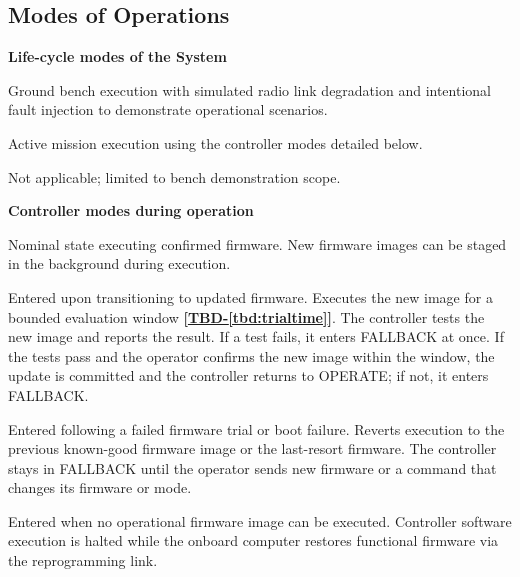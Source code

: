 \documentclass[11pt,a4paper]{article}
\newcommand{\tbd}[1]{\mbox{\textbf{[\hyperref[tbd:#1]{TBD-\ref*{tbd:#1}}]}}}
\begin{document}
\subsection{Modes of Operations}
\noindent\textbf{Life-cycle modes of the System}
\begin{description}[leftmargin=3cm]
\item[Test] Ground bench execution with simulated radio link degradation and
  intentional fault injection to demonstrate operational scenarios.
\item[Operation] Active mission execution using the controller modes detailed
  below.
\item[Disposal] Not applicable; limited to bench demonstration scope.
\end{description}

\medskip
\noindent\textbf{Controller modes during operation}
\begin{description}[leftmargin=3cm]
\item[OPERATE] Nominal state executing confirmed firmware. New firmware images
  can be staged in the background during execution.
\item[TRIAL] Entered upon transitioning to updated firmware. Executes the new
  image for a bounded evaluation window \tbd{trialtime}. The controller tests
  the new image and reports the result. If a test fails, it enters FALLBACK at
  once. If the tests pass and the operator confirms the new image within the
  window, the update is committed and the controller returns to OPERATE; if
  not, it enters FALLBACK.
\item[FALLBACK] Entered following a failed firmware trial or boot failure.
  Reverts execution to the previous known-good firmware image or the
  last-resort firmware. The controller stays in FALLBACK until the operator
  sends new firmware or a command that changes its firmware or mode.
\item[RECOVERY] Entered when no operational firmware image can be executed.
  Controller software execution is halted while the onboard computer restores
  functional firmware via the reprogramming link.
\end{description}
\end{document}
